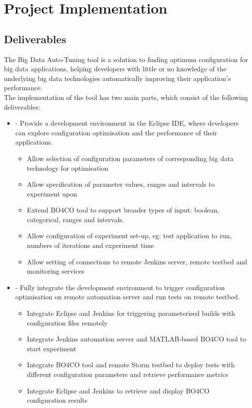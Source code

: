 \newpage
\section{Project Implementation}
\subsection{Deliverables}
The Big Data Auto-Tuning tool is a solution to finding optimum configuration for big data applications, helping developers with little or no knowledge of the underlying big data technologies automatically improving their application’s performance.\\
The implementation of the tool has two main parts, which consist of the following deliverables:
\begin{itemize}
\item -	Provide a development environment in the Eclipse IDE, where developers can explore configuration optimisation and the performance of their applications.
	\begin{itemize}
	\item Allow selection of configuration parameters of corresponding big data technology for optimisation
    \item Allow specification of parameter values, ranges and intervals to experiment upon
    \item Extend BO4CO tool to support broader types of input: boolean, categorical, ranges and intervals.
    \item Allow configuration of experiment set-up, eg: test application to run, numbers of iterations and experiment time
    \item Allow setting of connections to remote Jenkins server, remote testbed and monitoring services 
	\end{itemize}
\item -	Fully integrate the development environment to trigger configuration optimisation on remote automation server and run tests on remote testbed.
	\begin{itemize}
	\item Integrate Eclipse and Jenkins for triggering parameterised builds with configuration files remotely
    \item Integrate Jenkins automation server and MATLAB-based BO4CO tool to start experiment
	\item Integrate BO4CO tool and remote Storm testbed to deploy tests with different configuration parameters and retrieve performance metrics
    \item Integrate Eclipse and Jenkins to retrieve and display BO4CO configuration results
	\end{itemize}
\end{itemize}

